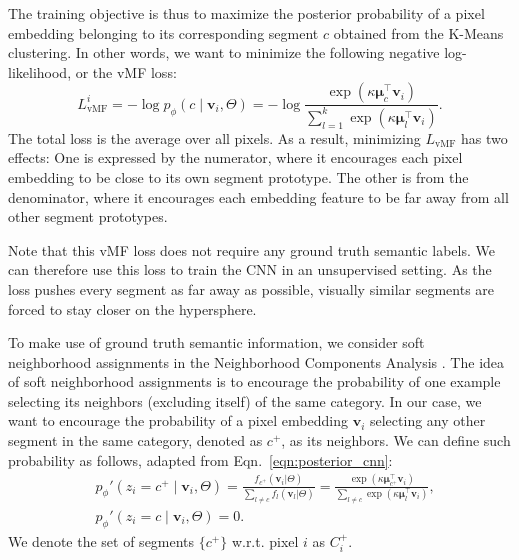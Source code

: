 \documentclass[10pt,twocolumn,letterpaper]{article}
\begin{document}
The training objective is thus to maximize the posterior probability of a pixel embedding belonging to its corresponding segment $c$ obtained from the K-Means clustering.
In other words, we want to minimize the following negative log-likelihood, or the vMF loss:
\begin{equation}
\label{eqn:vmf_loss}
    L_\text{vMF}^i = -\log p_\phi(c\mid \pmb{v}_i, \Theta) = -\log \frac{ \exp(\kappa \pmb{\mu}_c^\top \pmb{v}_{i} ) }{ \sum_{l=1}^k \exp(\kappa \pmb{\mu}_l^\top \pmb{v}_i) }.
\end{equation}
The total loss is the average over all pixels.
As a result, minimizing $L_\text{vMF}$ has two effects:
One is expressed by the numerator, where it encourages each pixel embedding to be close to its own segment prototype.
The other is from the denominator, where it encourages each embedding feature to be far away from all other segment prototypes. 


Note that this vMF loss does not require any ground truth semantic labels.
We can therefore use this loss to train the CNN in an unsupervised setting.
As the loss pushes every segment as far away as possible, visually similar segments are forced to stay closer on the hypersphere.


To make use of ground truth semantic information, we consider soft neighborhood assignments in the Neighborhood Components Analysis \cite{goldberger2005neighbourhood}.
The idea of soft neighborhood assignments is to encourage the probability of one example selecting its neighbors (excluding itself) of the same category.
In our case, we want to encourage the probability of a pixel embedding $\pmb{v}_i$ selecting any other segment in the same category, denoted as  $c^+$, as its neighbors.
We can define such probability as follows, adapted from Eqn.~\ref{eqn:posterior_cnn}:
\begin{align}
\nonumber &p_\phi'(z_i=c^+\mid \pmb{v}_i, \Theta) = \frac{f_{c^+}(\pmb{v}_i|\Theta)}{\sum_{l \neq c} f_l(\pmb{v}_l|\Theta)} = \frac{ \exp(\kappa \pmb{\mu}_{c^+}^\top \pmb{v}_i) }{ \sum_{l\neq c} \exp(\kappa \pmb{\mu}_l^\top \pmb{v}_i) }, \\
&p_\phi'(z_i=c\mid \pmb{v}_i, \Theta) = 0.
\end{align}
We denote the set of segments $\{c^+\}$ w.r.t. pixel $i$ as $C_i^+$.
\end{document}
